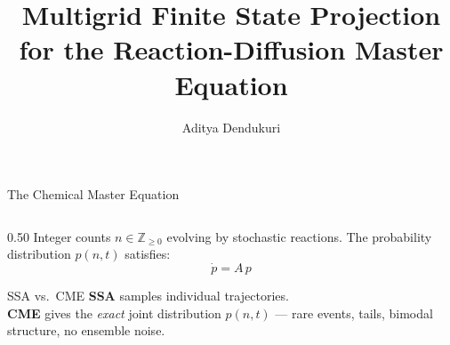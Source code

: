 \documentclass[10pt,aspectratio=169]{beamer}
\title[Multigrid FSP for RDME]{%
  Multigrid Finite State Projection\\
  for the Reaction-Diffusion Master Equation}
\author{Aditya Dendukuri}
\institute[UCSB]{University of California, Santa Barbara}
\date{}
\begin{document}
\begin{frame}\titlepage\end{frame}


\begin{frame}{The Chemical Master Equation}

  \begin{columns}[T]
    \begin{column}{0.50\textwidth}
      Integer counts $n \in \mathbb{Z}_{\geq 0}$ evolving by stochastic reactions.
      The probability distribution $p(n,t)$ satisfies:
      \[
        \dot{p} = A\,p
      \]

      \begin{alertblock}{SSA vs.\ CME}
        \textbf{SSA} samples individual trajectories.\\[0.3em]
        \textbf{CME} gives the \emph{exact} joint distribution
        $p(n,t)$ --- rare events, tails, bimodal structure, no ensemble noise.
      \end{alertblock}


\end{column}
\end{columns}
\end{frame}
\end{document}

